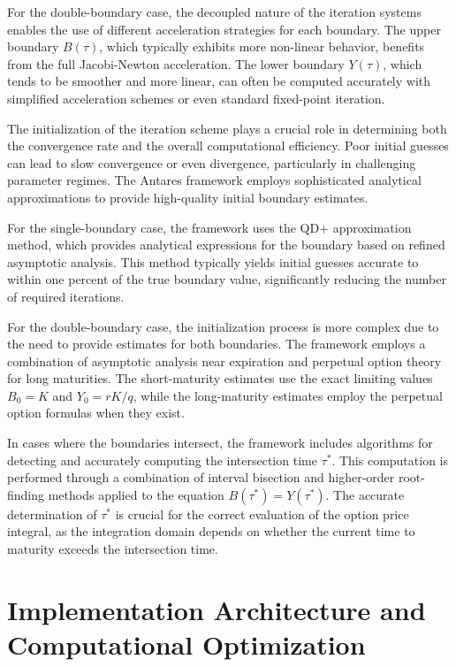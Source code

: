 \documentclass[
  american,
  11pt,
  11pt,
  letterpaper,
  onecolumn]{article}
\begin{document}
For the double-boundary case, the decoupled nature of the iteration
systems enables the use of different acceleration strategies for each
boundary. The upper boundary \(B(\tau)\), which typically exhibits more
non-linear behavior, benefits from the full Jacobi-Newton acceleration.
The lower boundary \(Y(\tau)\), which tends to be smoother and more
linear, can often be computed accurately with simplified acceleration
schemes or even standard fixed-point iteration.

The initialization of the iteration scheme plays a crucial role in
determining both the convergence rate and the overall computational
efficiency. Poor initial guesses can lead to slow convergence or even
divergence, particularly in challenging parameter regimes. The Antares
framework employs sophisticated analytical approximations to provide
high-quality initial boundary estimates.

For the single-boundary case, the framework uses the QD+ approximation
method, which provides analytical expressions for the boundary based on
refined asymptotic analysis. This method typically yields initial
guesses accurate to within one percent of the true boundary value,
significantly reducing the number of required iterations.

For the double-boundary case, the initialization process is more complex
due to the need to provide estimates for both boundaries. The framework
employs a combination of asymptotic analysis near expiration and
perpetual option theory for long maturities. The short-maturity
estimates use the exact limiting values \(B_0 = K\) and \(Y_0 = rK/q\),
while the long-maturity estimates employ the perpetual option formulas
when they exist.

In cases where the boundaries intersect, the framework includes
algorithms for detecting and accurately computing the intersection time
\(\tau^*\). This computation is performed through a combination of
interval bisection and higher-order root-finding methods applied to the
equation \(B(\tau^*) = Y(\tau^*)\). The accurate determination of
\(\tau^*\) is crucial for the correct evaluation of the option price
integral, as the integration domain depends on whether the current time
to maturity exceeds the intersection time.

\section{Implementation Architecture and Computational
Optimization}\label{implementation-architecture-and-computational-optimization}
\end{document}
